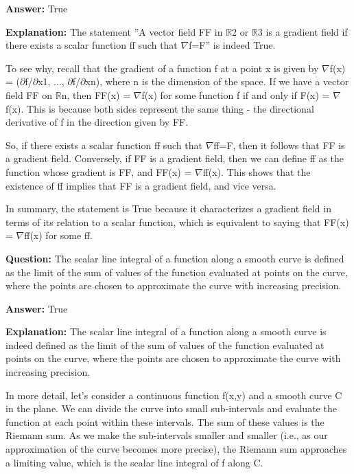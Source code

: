 \documentclass{article}
\begin{document}
                \textbf{Answer:} True

                \textbf{Explanation:} The statement ''A vector field FF in \ensuremath{\mathbb{R}}2 or \ensuremath{\mathbb{R}}3 is a gradient field if there exists a scalar function ff such that \ensuremath{\nabla}f=F'' is indeed True.

To see why, recall that the gradient of a function f at a point x is given by \ensuremath{\nabla}f(x) = (\ensuremath{\partial}f/\ensuremath{\partial}x1, ..., \ensuremath{\partial}f/\ensuremath{\partial}xn), where n is the dimension of the space. If we have a vector field FF on \ensuremath{\mathbb{R}}n, then FF(x) = \ensuremath{\nabla}f(x) for some function f if and only if F(x) = \ensuremath{\nabla}f(x). This is because both sides represent the same thing - the directional derivative of f in the direction given by FF.

So, if there exists a scalar function ff such that \ensuremath{\nabla}ff=F, then it follows that FF is a gradient field. Conversely, if FF is a gradient field, then we can define ff as the function whose gradient is FF, and FF(x) = \ensuremath{\nabla}ff(x). This shows that the existence of ff implies that FF is a gradient field, and vice versa.

In summary, the statement is True because it characterizes a gradient field in terms of its relation to a scalar function, which is equivalent to saying that FF(x) = \ensuremath{\nabla}ff(x) for some ff.
                
                \vspace{0.5cm} 
        
            
                \textbf {Question:} The scalar line integral of a function along a smooth curve is defined as the limit of the sum of values of the function evaluated at points on the curve, where the points are chosen to approximate the curve with increasing precision.
                
                \textbf{Answer:} True

                \textbf{Explanation:} The scalar line integral of a function along a smooth curve is indeed defined as the limit of the sum of values of the function evaluated at points on the curve, where the points are chosen to approximate the curve with increasing precision.

In more detail, let's consider a continuous function f(x,y) and a smooth curve C in the plane. We can divide the curve into small sub-intervals and evaluate the function at each point within these intervals. The sum of these values is the Riemann sum. As we make the sub-intervals smaller and smaller (i.e., as our approximation of the curve becomes more precise), the Riemann sum approaches a limiting value, which is the scalar line integral of f along C.
\end{document}

